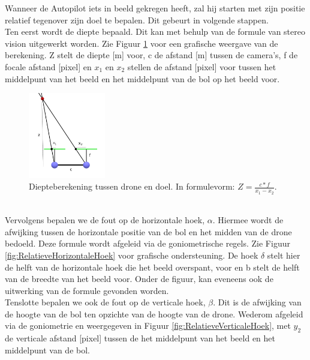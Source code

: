 \noindent
Wanneer de Autopilot iets in beeld gekregen heeft, zal hij starten met zijn positie relatief tegenover zijn doel te bepalen. Dit gebeurt in volgende stappen.
\\
Ten eerst wordt de diepte bepaald. Dit kan met behulp van de formule van stereo vision \cite{website:techbriefs} uitgewerkt worden.
Zie Figuur \ref{fig:DiepteberekeningDroneEnDoel} voor een grafische weergave van de berekening. Z stelt de diepte [m] voor, c de afstand [m] tussen de camera's, f de focale afstand [pixel] en $x_1$ en $x_2$ stellen de afstand [pixel] voor tussen het middelpunt van het beeld en het middelpunt van de bol op het beeld voor.
\begin{figure}[h]
	\centering
	\includegraphics[width=0.3\textwidth]{DiepteberekeningDroneEnDoel.png}
	\caption{Diepteberekening tussen drone en doel. In formulevorm: \(Z = \frac{c * f}{x_1 - x_2}\).}
	\label{fig:DiepteberekeningDroneEnDoel}
\end{figure}
\\
Vervolgens bepalen we de fout op de horizontale hoek, $\alpha$. Hiermee wordt de afwijking tussen de horizontale positie van de bol en het midden van de drone bedoeld. Deze formule wordt afgeleid via de goniometrische regels. Zie Figuur \ref{fig:RelatieveHorizontaleHoek} voor grafische ondersteuning. De hoek $\delta$ stelt hier de helft van de horizontale hoek die het beeld overspant, voor en b stelt de helft van de breedte van het beeld voor. Onder de figuur, kan eveneens ook de uitwerking van de formule gevonden worden.
\\
Tenslotte bepalen we ook de fout op de verticale hoek, $\beta$. Dit is de afwijking van de hoogte van de bol ten opzichte van de hoogte van de drone. Wederom afgeleid via de goniometrie en weergegeven in Figuur \ref{fig:RelatieveVerticaleHoek}, met $y_2$ de verticale afstand [pixel] tussen de het middelpunt van het beeld en het middelpunt van de bol.
